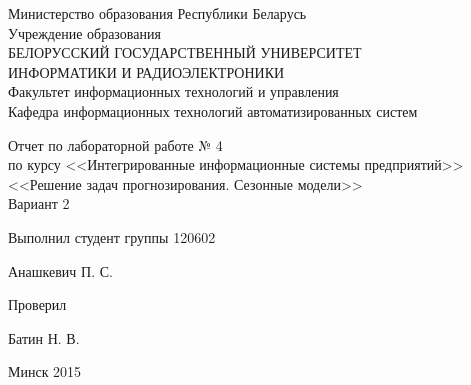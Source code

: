 \thispagestyle{empty}
\setlength{\parindent}{0ex} %

\begin{center}
  Министерство образования Республики Беларусь \\
  \vspace{0.5ex}
  Учреждение образования \\
  БЕЛОРУССКИЙ ГОСУДАРСТВЕННЫЙ УНИВЕРСИТЕТ \\
  ИНФОРМАТИКИ И РАДИОЭЛЕКТРОНИКИ \\
  \vspace{0.5ex}
  Факультет информационных технологий и управления \\
  \vspace{0.5ex}
  Кафедра информационных технологий автоматизированных систем
\end{center}

\vspace{50mm}

\begin{center}
  Отчет по лабораторной работе № 4 \\
  по курсу <<Интегрированные информационные системы предприятий>> \\
  <<Решение задач прогнозирования. Сезонные модели>> \\
  Вариант 2
\end{center}

\vspace{40mm}

\begin{minipage}{.55\linewidth}
    Выполнил студент группы 120602
\end{minipage}
\hfill
\begin{minipage}{.4\linewidth}
  \begin{flushright}
    Анашкевич П. С.
  \end{flushright}
\end{minipage}

\begin{minipage}{.55\linewidth}
    Проверил
\end{minipage}
\hfill
\begin{minipage}{.4\linewidth}
  \begin{flushright}
    Батин Н. В.
  \end{flushright}
\end{minipage}

\vspace{55mm}
\begin{center}
  Минск 2015
\end{center}

\setlength{\parindent}{5ex} %

\newpage
